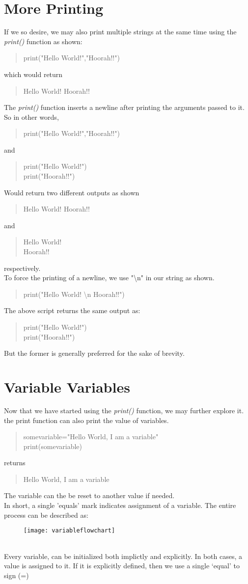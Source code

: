 \section{More Printing}
If we so desire, we may also print multiple strings at the same time using the \emph{print()} function as shown:
\begin{quote}
print("Hello World!","Hoorah!!")
\end{quote}
which would return
\begin{quote}
Hello World! Hoorah!!
\end{quote}
The \emph{print()} function inserts a newline after printing the arguments passed to it. So in other words,
\begin{quote}
print("Hello World!","Hoorah!!")
\end{quote}
and 
\begin{quote}
print("Hello World!")\\
print("Hoorah!!")
\end{quote}
Would return two different outputs as shown
\begin{quote}
Hello World! Hoorah!!
\end{quote}
and 
\begin{quote}
Hello World!\\
Hoorah!!
\end{quote}
respectively.\\
To force the printing of a newline, we use "\textbackslash n" in our string as shown.
\begin{quote}
print("Hello World! \textbackslash n Hoorah!!")
\end{quote}
The above script returns the same output as:
\begin{quote}
print("Hello World!")\\
print("Hoorah!!")
\end{quote}
But the former is generally preferred for the sake of brevity.
\section{Variable Variables}
Now that we have started using the \emph{print()} function, we may further explore it.\\
the print function can also print the value of variables.
\begin{quote}
somevariable="Hello World, I am a variable"\\
print(somevariable)
\end{quote}
returns
\begin{quote}
Hello World, I am a variable
\end{quote}
The variable can the be reset to another value if needed.\\ In short, a single 'equals' mark indicates assignment of a variable.
The entire process can be described as: 
\begin{figure}[h]
\texttt{[image: variableflowchart]}
\end{figure}
\\
Every variable, can be initialized both implictly and explicitly. In both cases, a value is assigned to it. If it is explicitly defined, then we use a single `equal' to sign (=)
